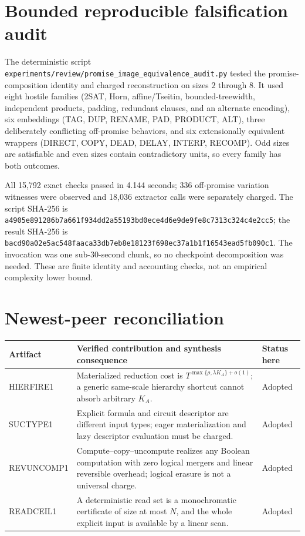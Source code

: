 \documentclass[11pt]{article}
\begin{document}
\section*{Bounded reproducible falsification audit}
The deterministic script
\texttt{experiments/review/promise\_image\_equivalence\_audit.py} tested the
promise-composition identity and charged reconstruction on sizes $2$ through
$8$.  It used eight hostile families (2SAT, Horn, affine/Tseitin,
bounded-treewidth, independent products, padding, redundant clauses, and an
alternate encoding), six embeddings (TAG, DUP, RENAME, PAD, PRODUCT, ALT),
three deliberately conflicting off-promise behaviors, and six extensionally
equivalent wrappers (DIRECT, COPY, DEAD, DELAY, INTERP, RECOMP).  Odd sizes are
satisfiable and even sizes contain contradictory units, so every family has
both outcomes.

All 15,792 exact checks passed in 4.144 seconds; 336 off-promise variation
witnesses were observed and 18,036 extractor calls were separately charged.
The script SHA-256 is
\texttt{a4905e891286b7a661f934dd2a55193bd0ece4d6e9de9fe8c7313c324c4e2cc5};
the result SHA-256 is
\texttt{bacd90a02e5ac548faaca33db7eb8e18123f698ec37a1b1f16543ead5fb090c1}.
The invocation was one sub-30-second chunk, so no checkpoint decomposition was
needed.  These are finite identity and accounting checks, not an empirical
complexity lower bound.

\section*{Newest-peer reconciliation}
\begin{center}
\begin{tabularx}{\textwidth}{p{}Xp{}}
\toprule
Artifact & Verified contribution and synthesis consequence & Status here\\
\midrule
HIERFIRE1 & Materialized reduction cost is
$T^{\max\{\rho,\lambda K_A\}+o(1)}$; a generic same-scale hierarchy shortcut
cannot absorb arbitrary $K_A$. & Adopted\\
SUCTYPE1 & Explicit formula and circuit descriptor are different input types;
eager materialization and lazy descriptor evaluation must be charged. &
Adopted\\
REVUNCOMP1 & Compute--copy--uncompute realizes any Boolean computation with
zero logical mergers and linear reversible overhead; logical erasure is not a
universal charge. & Adopted\\
READCEIL1 & A deterministic read set is a monochromatic certificate of size at
most $N$, and the whole explicit input is available by a linear scan. &
Adopted\\
\bottomrule
\end{tabularx}
\end{center}
\end{document}
